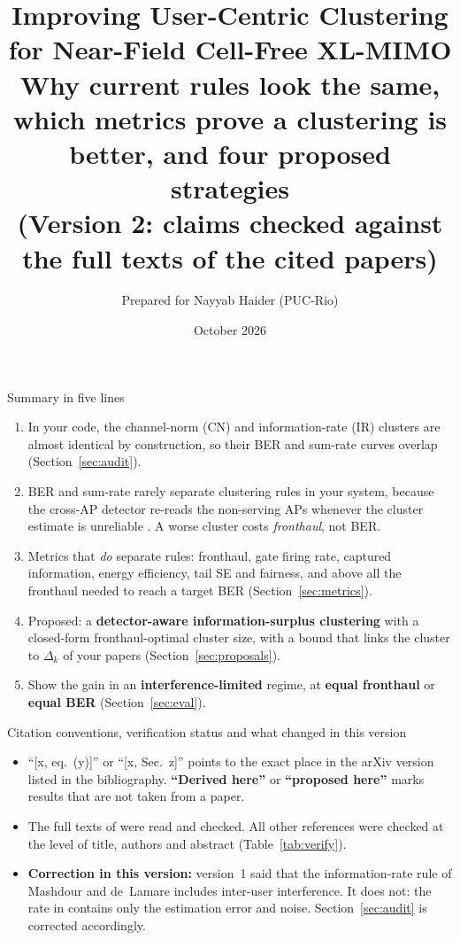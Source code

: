 \documentclass[11pt]{article}
\title{\textbf{Improving User-Centric Clustering for Near-Field Cell-Free XL-MIMO}\\[2pt]
\large Why current rules look the same, which metrics prove a clustering is better, and four proposed strategies\\[2pt]
\normalsize (Version 2: claims checked against the full texts of the cited papers)}
\author{Prepared for Nayyab Haider (PUC-Rio)}
\date{October 2026}
\begin{document}
\maketitle

\begin{keybox}{Summary in five lines}
\begin{enumerate}[leftmargin=*]
  \item In your code, the channel-norm (CN) and information-rate (IR) clusters are almost identical by construction, so their BER and sum-rate curves overlap (Section~\ref{sec:audit}).
  \item BER and sum-rate rarely separate clustering rules in your system, because the cross-AP detector re-reads the non-serving APs whenever the cluster estimate is unreliable \cite{haider2026icassp,haider2026vtc}. A worse cluster costs \emph{fronthaul}, not BER.
  \item Metrics that \emph{do} separate rules: fronthaul, gate firing rate, captured information, energy efficiency, tail SE and fairness, and above all the fronthaul needed to reach a target BER (Section~\ref{sec:metrics}).
  \item Proposed: a \textbf{detector-aware information-surplus clustering} with a closed-form fronthaul-optimal cluster size, with a bound that links the cluster to $\Delta_k$ of your papers (Section~\ref{sec:proposals}).
  \item Show the gain in an \textbf{interference-limited} regime, at \textbf{equal fronthaul} or \textbf{equal BER} (Section~\ref{sec:eval}).
\end{enumerate}
\end{keybox}

\begin{warnbox}{Citation conventions, verification status and what changed in this version}
\begin{itemize}[leftmargin=*]
  \item ``[x, eq.~(y)]'' or ``[x, Sec.~z]'' points to the exact place in the arXiv version listed in the bibliography. \textbf{``Derived here''} or \textbf{``proposed here''} marks results that are not taken from a paper.
  \item The full texts of \cite{mashdour2024study,tesolin2026gbse,tesolin2026gbsa,lai2024hybridua} were read and checked. All other references were checked at the level of title, authors and abstract (Table~\ref{tab:verify}).
  \item \textbf{Correction in this version:} version~1 said that the information-rate rule of Mashdour and de~Lamare includes inter-user interference. It does not: the rate in \cite[eq.~(11)]{mashdour2024study} contains only the estimation error and noise. Section~\ref{sec:audit} is corrected accordingly.
\end{itemize}
\end{warnbox}
\end{document}
